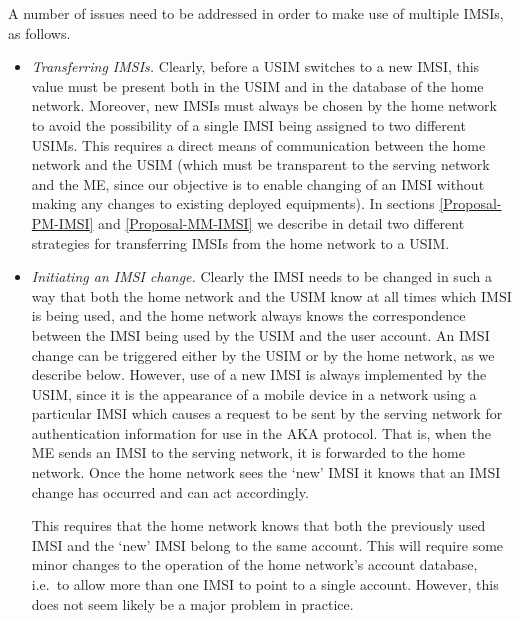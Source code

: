 \documentclass{acm_proc_article-sp}
\begin{document}
A number of issues need to be addressed in order to make use of multiple IMSIs, as follows.
\begin{itemize}

\item \emph{Transferring IMSIs.} Clearly, before a USIM switches to a new IMSI, this value must be present both in the USIM and in the database of the home network. Moreover, new IMSIs must always be chosen by the home network to avoid the possibility of a single IMSI being assigned to two different USIMs. This requires a direct means of communication between the home network and the USIM (which must be transparent to the serving network and the ME, since our objective is to enable changing of an IMSI without making any changes to existing deployed equipments). In sections \ref{Proposal-PM-IMSI} and \ref{Proposal-MM-IMSI} we describe in detail two different strategies for transferring IMSIs from the home network to a USIM.

\item \emph{Initiating an IMSI change.} Clearly the IMSI needs to be changed in such a way that both the home network and the USIM know at all times which IMSI is being used, and the home network always knows the correspondence between the IMSI being used by the USIM and the user account. An IMSI change can be triggered either by the USIM or by the home network, as we describe below. However, use of a new IMSI is always implemented by the USIM, since it is the appearance of a mobile device in a network using a particular IMSI which causes a request to be sent by the serving network for authentication information for use in the AKA protocol. That is, when the ME sends an IMSI to the serving network, it is forwarded to the home network.  Once the home network sees the `new' IMSI it knows that an IMSI change has occurred and can act accordingly.

This requires that the home network knows that both the previously used IMSI and the `new' IMSI belong to the same account. This will require some minor changes to the operation of the home network's account database, i.e.\ to allow more than one IMSI to point to a single account. However, this does not seem likely be a major problem in practice.


\end{itemize}
\end{document}
